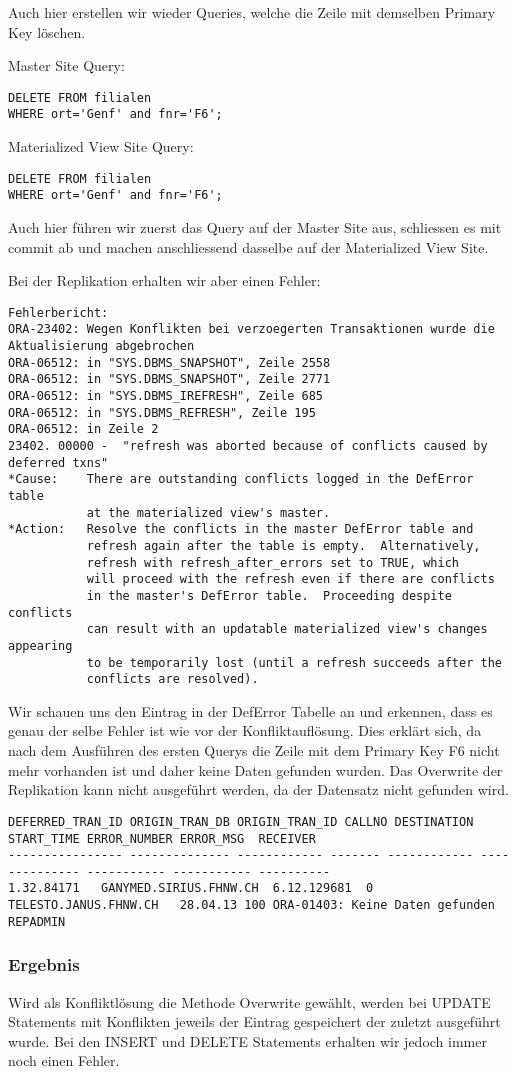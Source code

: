 \documentclass[11pt,a4paper,parskip=half]{scrartcl}
\begin{document}
Auch hier erstellen wir wieder Queries, welche die Zeile mit demselben Primary Key löschen.

Master Site Query:
\begin{lstlisting}
DELETE FROM filialen
WHERE ort='Genf' and fnr='F6'; 
\end{lstlisting}

Materialized View Site Query:
\begin{lstlisting}
DELETE FROM filialen
WHERE ort='Genf' and fnr='F6'; 
\end{lstlisting}

Auch hier führen wir zuerst das Query auf der Master Site aus, schliessen es mit commit ab und machen anschliessend dasselbe auf der Materialized View Site.

Bei der Replikation erhalten wir aber einen Fehler:
\begin{lstlisting}
Fehlerbericht:
ORA-23402: Wegen Konflikten bei verzoegerten Transaktionen wurde die Aktualisierung abgebrochen
ORA-06512: in "SYS.DBMS_SNAPSHOT", Zeile 2558
ORA-06512: in "SYS.DBMS_SNAPSHOT", Zeile 2771
ORA-06512: in "SYS.DBMS_IREFRESH", Zeile 685
ORA-06512: in "SYS.DBMS_REFRESH", Zeile 195
ORA-06512: in Zeile 2
23402. 00000 -  "refresh was aborted because of conflicts caused by deferred txns"
*Cause:    There are outstanding conflicts logged in the DefError table
           at the materialized view's master.
*Action:   Resolve the conflicts in the master DefError table and
           refresh again after the table is empty.  Alternatively,
           refresh with refresh_after_errors set to TRUE, which
           will proceed with the refresh even if there are conflicts
           in the master's DefError table.  Proceeding despite conflicts
           can result with an updatable materialized view's changes appearing
           to be temporarily lost (until a refresh succeeds after the
           conflicts are resolved).
\end{lstlisting}

Wir schauen uns den Eintrag in der DefError Tabelle an und erkennen, dass es genau der selbe Fehler ist wie vor der Konfliktauflösung. Dies erklärt sich, da nach dem Ausführen des ersten Querys die Zeile mit dem Primary Key F6 nicht mehr vorhanden ist und daher keine Daten gefunden wurden. Das Overwrite der Replikation kann nicht ausgeführt werden, da der Datensatz nicht gefunden wird.
\begin{lstlisting}
DEFERRED_TRAN_ID ORIGIN_TRAN_DB ORIGIN_TRAN_ID CALLNO DESTINATION START_TIME ERROR_NUMBER ERROR_MSG  RECEIVER
---------------- -------------- ------------ ------- ------------ -------------- ----------- ----------- ----------
1.32.84171   GANYMED.SIRIUS.FHNW.CH  6.12.129681  0 TELESTO.JANUS.FHNW.CH   28.04.13 100 ORA-01403: Keine Daten gefunden  REPADMIN
\end{lstlisting}
\subsubsection{Ergebnis}
Wird als Konfliktlösung die Methode Overwrite gewählt, werden bei UPDATE Statements mit Konflikten jeweils der Eintrag gespeichert der zuletzt ausgeführt wurde. Bei den INSERT und DELETE Statements erhalten wir jedoch immer noch einen Fehler. 
\end{document}
